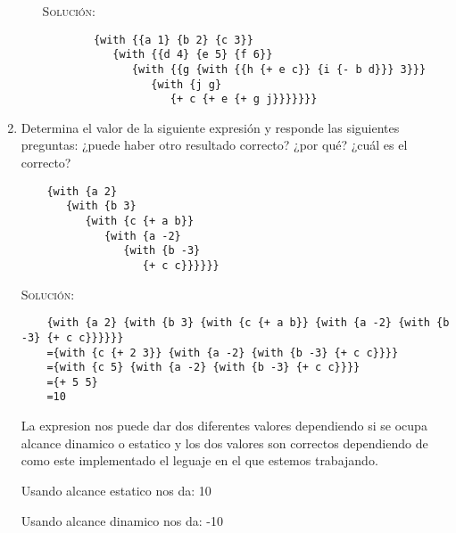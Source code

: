 \documentclass[letterpaper,11pt]{article}
\begin{document}
\begin{enumerate}
\begin{enumerate}
        \textsc{Solución:}
        \begin{verbatim}
        {with {{a 1} {b 2} {c 3}} 
           {with {{d 4} {e 5} {f 6}} 
              {with {{g {with {{h {+ e c}} {i {- b d}}} 3}}}
              	 {with {j g}
                 	{+ c {+ e {+ g j}}}}}}}
        \end{verbatim}
    \end{enumerate}

    \item Determina el valor de la siguiente expresión y responde las siguientes 
    preguntas: ¿puede haber otro resultado correcto? ¿por qué? ¿cuál es el 
    correcto? 
    \begin{verbatim}
    {with {a 2} 
       {with {b 3} 
          {with {c {+ a b}} 
             {with {a -2} 
                {with {b -3} 
                   {+ c c}}}}}}
    \end{verbatim}

    \textsc{Solución:} 
    \begin{verbatim}
    {with {a 2} {with {b 3} {with {c {+ a b}} {with {a -2} {with {b -3} {+ c c}}}}}}
    ={with {c {+ 2 3}} {with {a -2} {with {b -3} {+ c c}}}}
    ={with {c 5} {with {a -2} {with {b -3} {+ c c}}}}
    ={+ 5 5}
    =10
    \end{verbatim}
    La expresion nos puede dar dos diferentes valores dependiendo si se ocupa alcance dinamico 	
    o estatico y los dos valores son correctos dependiendo de como este implementado el leguaje 
    en el que estemos trabajando.
    
    Usando alcance estatico nos da:  10
    
    Usando alcance dinamico nos da: -10
\end{enumerate}
\end{document}
